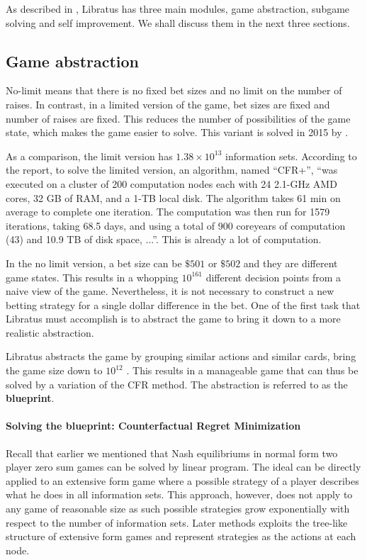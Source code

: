 \documentclass[10pt,a4paper]{article}
\begin{document}
As described in \cite{brown2017superhuman}, Libratus has three main modules, game abstraction, subgame solving and self improvement. We shall discuss them in the next three sections.

\subsection{Game abstraction}
No-limit means that there is no fixed bet sizes and no limit on the number of raises. In contrast, in a limited version of the game, bet sizes are fixed and number of raises are fixed. This reduces the number of possibilities of the game state, which makes the game easier to solve. This variant is solved in 2015 by \cite{bowling2015heads}.

As a comparison, the limit version has $1.38 \times 10^{13}$ information sets. According to the report, to solve the limited version, an algorithm, named ``CFR+'', ``was executed on a cluster of 200 computation nodes each with 24 2.1-GHz AMD cores, 32 GB of RAM, and a 1-TB local disk. The algorithm takes 61 min on average to complete one iteration. The computation was then run for 1579 iterations, taking 68.5 days, and using a total of 900 coreyears of computation (43) and 10.9 TB of disk space, ...''. This is already a lot of computation.

In the no limit version, a bet size can be $\$ 501$ or $\$ 502$ and they are different game states. This results in a whopping $10^161$ different decision points from a naive view of the game. Nevertheless, it is not necessary to construct a new betting strategy for a single dollar difference  in the bet. One of the first task that Libratus must accomplish is to abstract the game to bring it down to a more realistic abstraction.

Libratus abstracts the game by grouping similar actions and similar cards, bring the game size down to $10^{12}$ \cite{brown2017superhuman}. This results in a manageable game that can thus be solved by a variation of the CFR method. The abstraction is referred to as the \textbf{blueprint}.

\paragraph{Solving the blueprint: Counterfactual Regret Minimization}
Recall that earlier we mentioned that Nash equilibriums in normal form two player zero sum games can be solved by linear program. The ideal can be directly applied to an extensive form game where a possible strategy of a player describes what he does in all information sets. This approach, however, does not apply to any game of reasonable size as such possible strategies grow exponentially with respect to the number of information sets. Later methods exploits the tree-like structure of extensive form games and represent strategies as the actions at each node.
\end{document}

